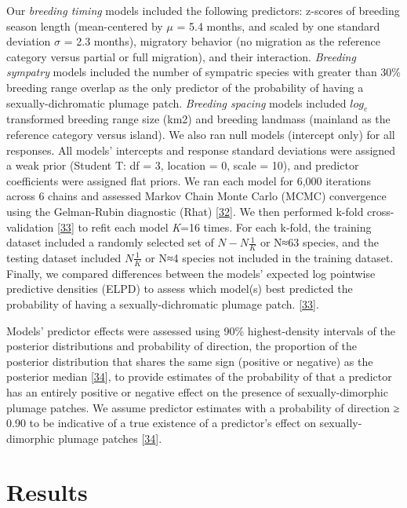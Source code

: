 \documentclass[
  a4paper,
]{article}
\begin{document}
Our \emph{breeding timing} models included the following predictors:
z-scores of breeding season length (mean-centered by \(\mu\) = 5.4
months, and scaled by one standard deviation \(\sigma\) = 2.3 months),
migratory behavior (no migration as the reference category versus
partial or full migration), and their interaction. \emph{Breeding
sympatry} models included the number of sympatric species with greater
than 30\% breeding range overlap as the only predictor of the
probability of having a sexually-dichromatic plumage patch.
\emph{Breeding spacing} models included \(log_{e}\) transformed breeding
range size (km2) and breeding landmass (mainland as the reference
category versus island). We also ran null models (intercept only) for
all responses. All models' intercepts and response standard deviations
were assigned a weak prior (Student T: df = 3, location = 0, scale =
10), and predictor coefficients were assigned flat priors. We ran each
model for 6,000 iterations across 6 chains and assessed Markov Chain
Monte Carlo (MCMC) convergence using the Gelman-Rubin diagnostic (Rhat)
{[}\protect\hyperlink{ref-gelman2013}{32}{]}. We then performed k-fold
cross-validation {[}\protect\hyperlink{ref-vehtari2017}{33}{]} to refit
each model \emph{K}=16 times. For each k-fold, the training dataset
included a randomly selected set of \(N- N\frac{1}{K}\) or N≈63 species,
and the testing dataset included \(N\frac{1}{K}\) or N≈4 species not
included in the training dataset. Finally, we compared differences
between the models' expected log pointwise predictive densities (ELPD)
to assess which model(s) best predicted the probability of having a
sexually-dichromatic plumage patch.
{[}\protect\hyperlink{ref-vehtari2017}{33}{]}⁠.

Models' predictor effects were assessed using 90\% highest-density
intervals of the posterior distributions and probability of direction,
the proportion of the posterior distribution that shares the same sign
(positive or negative) as the posterior median
{[}\protect\hyperlink{ref-makowski2019}{34}{]}, to provide estimates of
the probability of that a predictor has an entirely positive or negative
effect on the presence of sexually-dimorphic plumage patches. We assume
predictor estimates with a probability of direction ≥ 0.90 to be
indicative of a true existence of a predictor's effect on
sexually-dimorphic plumage patches
{[}\protect\hyperlink{ref-makowski2019}{34}{]}.

\hypertarget{results}{%
\section{Results}\label{results}}
\end{document}
